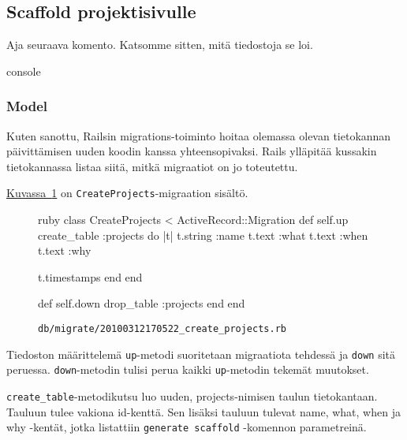 \documentclass{article}
\newenvironment{myfigure}[1][tbp]{
  \begin{figure}[#1]
    \centering
    \begin{lrbox}{\myfigurebox}
      \begin{minipage}{\textwidth}
}{
      \end{minipage}
    \end{lrbox}
    \colorbox{blue!4}{\usebox{\myfigurebox}}
  \end{figure}
}
\newcommand{\myref}[2]{\hyperref[#2]{#1~\ref*{#2}}}
\newcommand{\pdfforeignlanguage}[2]{\texorpdfstring{\foreignlanguage{#1}{#2}}{#2}}
\newcommand{\eng}[1]{\pdfforeignlanguage{english}{#1}}
\begin{document}
\subsection{\eng{Scaffold} projektisivulle}

\begin{samepage}
Aja seuraava komento. Katsomme sitten, mitä tiedostoja se loi.

\begin{pygmented}{console}
\end{pygmented}
\end{samepage}

\subsubsection{\eng{Model}}

Kuten sanottu, Railsin migrations-toiminto hoitaa olemassa olevan tietokannan
päivittämisen uuden koodin kanssa yhteensopivaksi. Rails ylläpitää kussakin
tietokannassa listaa siitä, mitkä migraatiot on jo toteutettu.

\begin{samepage}
\myref{Kuvassa}{fig:create-projects-migration} on
\texttt{CreateProjects}-migraation sisältö.

\begin{myfigure}[H]
\caption{\texttt{db/migrate/20100312170522\_create\_projects.rb}}
\label{fig:create-projects-migration}

\begin{pygmented}{ruby}
class CreateProjects < ActiveRecord::Migration
  def self.up
    create_table :projects do |t|
      t.string :name
      t.text :what
      t.text :when
      t.text :why

      t.timestamps
    end
  end

  def self.down
    drop_table :projects
  end
end
\end{pygmented}
\end{myfigure}
\end{samepage}

Tiedoston määrittelemä \texttt{up}-metodi suoritetaan migraatiota tehdessä ja
\texttt{down} sitä peruessa. \texttt{down}-metodin tulisi perua kaikki
\texttt{up}-metodin tekemät muutokset.

\texttt{create\_table}-metodikutsu luo uuden, projects-nimisen taulun
tietokantaan. Tauluun tulee vakiona id-kenttä. Sen lisäksi tauluun tulevat
name, what, when ja why -kentät, jotka listattiin \texttt{generate scaffold}
-komennon parametreinä.
\end{document}
